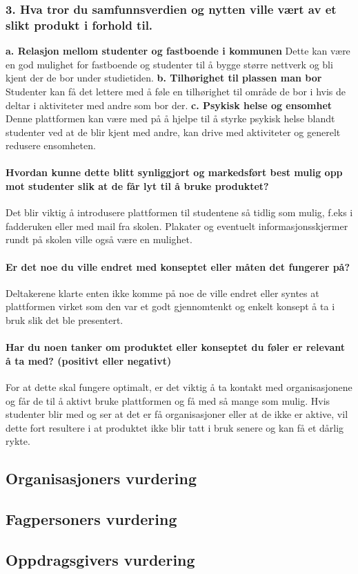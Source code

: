 \subsubsection{3. Hva tror du samfunnsverdien og nytten ville vært av et slikt produkt i forhold til.}

{\bf a. Relasjon mellom studenter og fastboende i kommunen}
Dette kan være en god mulighet for fastboende og studenter til å bygge større nettverk og bli kjent der de bor under studietiden.
{\bf b. Tilhørighet til plassen man bor}
Studenter kan få det lettere med å føle en tilhørighet til område de bor i hvis de deltar i aktiviteter med andre som bor der.
{\bf c. Psykisk helse og ensomhet}
Denne plattformen kan være med på å hjelpe til å styrke psykisk helse blandt studenter ved at de blir kjent med andre, kan drive med aktiviteter og generelt redusere ensomheten.
\paragraph{Hvordan kunne dette blitt synliggjort og markedsført best mulig opp mot studenter slik at de får lyt til å bruke produktet?} Det blir viktig å introdusere plattformen til studentene så tidlig som mulig, f.eks i fadderuken eller med mail fra skolen. Plakater og eventuelt informasjonsskjermer rundt på skolen ville også være en mulighet.

\paragraph{Er det noe du ville endret med konseptet eller måten det fungerer på?} Deltakerene klarte enten ikke komme på noe de ville endret eller syntes at plattformen virket som den var et godt gjennomtenkt og enkelt konsept å ta i bruk slik det ble presentert.

\paragraph{Har du noen tanker om produktet eller konseptet du føler er relevant å ta med? (positivt eller negativt)}
For at dette skal fungere optimalt, er det viktig å ta kontakt med organisasjonene og får de til å aktivt bruke plattformen og få med så mange som mulig. Hvis studenter blir med og ser at det er få organisasjoner eller at de ikke er aktive, vil dette fort resultere i at produktet ikke blir tatt i bruk senere og kan få et dårlig rykte. 
\subsection{Organisasjoners vurdering}

\subsection{Fagpersoners vurdering}

\subsection{Oppdragsgivers vurdering}




